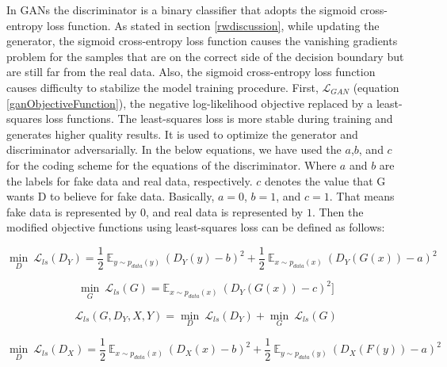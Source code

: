 In \acp{GAN} the discriminator is a binary classifier that adopts the sigmoid cross-entropy loss function. As stated in section \ref{rwdiscussion}, while updating the generator, the sigmoid cross-entropy loss function causes the vanishing gradients problem for the samples that are on the correct side of the decision boundary but are still far from the real data.  Also, the sigmoid cross-entropy loss function causes difficulty to stabilize the model training procedure\cite{mao2017squares}. First, $\mathcal{L}_{GAN}$ (equation \ref{ganObjectiveFunction}), the negative log-likelihood objective replaced by a least-squares loss functions\cite{mao2017squares}. The least-squares loss is more stable during training and generates higher quality results\cite{mao2017squares}. It is used to optimize the generator and discriminator adversarially. In the below equations, we have used the $a$,$b$, and $c$ for the coding scheme for the equations of the discriminator. Where $a$ and $b$ are the labels for fake data and real data, respectively. $c$ denotes the value that G wants D to believe for fake data. Basically, $a = 0$, $b = 1$, and $c = 1$. That means fake data is represented by $0$, and real data is represented by $1$. Then the modified objective functions using least-squares loss can be defined as follows:

    \begin{equation}\label{lsgan1}
        \underset{D}{\min}\ \mathcal{L}_{ls}(D_Y) = \frac{1}{2}\ \mathbb{E}_{y \sim p_{data}(y)}\ (D_Y(y) - b)^2 + 
        \frac{1}{2}\ \mathbb{E}_{x \sim p_{data}(x)}\ (D_Y(G(x)) - a)^2
    \end{equation}
    
    \begin{equation}\label{lsgan2}
        \underset{G}{\min}\ \mathcal{L}_{ls}(G) = \mathbb{E}_{x \sim p_{data}(x)}\ (D_Y(G(x)) - c)^2]
    \end{equation}
    
    \begin{equation}\label{lsgan3}
    \mathcal{L}_{ls}(G, D_Y, X, Y) =  \underset{D}{\min}\ \mathcal{L}_{ls}(D_Y) + \underset{G}{\min}\ \mathcal{L}_{ls}(G)
    \end{equation}
    
    \begin{equation}\label{lsgan4}
        \underset{D}{\min}\ \mathcal{L}_{ls}(D_X) = \frac{1}{2}\ \mathbb{E}_{x \sim p_{data}(x)}\ (D_X(x) - b)^2 + 
        \frac{1}{2}\ \mathbb{E}_{y \sim p_{data}(y)}\ (D_X(F(y)) - a)^2
    \end{equation}
    
